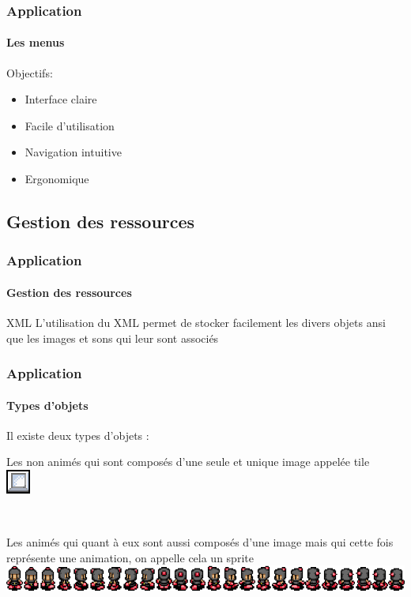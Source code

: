 	\begin{frame}
	\frametitle{Application}
	\framesubtitle{Les menus}
	
		\begin{block}{Objectifs:}
			\begin{itemize}
			  \item Interface claire
			  \item Facile d'utilisation
			  \item Navigation intuitive
			  \item Ergonomique
			\end{itemize}
		\end{block}
	\end{frame}
	
\subsection{Gestion des ressources}

	\begin{frame}
		\frametitle{Application}
		\framesubtitle{Gestion des ressources}
		
		\begin{block}{XML}
			L'utilisation du XML permet de stocker facilement les divers objets ansi que les images et sons qui leur sont associés
		\end{block}
		
	\end{frame}
	
	\begin{frame}
		\frametitle{Application}
		\framesubtitle{Types d'objets}
			Il existe deux types d'objets :
			
			\begin{center}
				Les non animés qui sont composés d'une seule et unique image appelée tile \\
				\includegraphics[scale=0.75]{img/bloc.png}
				
				$\,$
				
				\item Les animés qui quant à eux sont aussi composés d'une image mais qui cette fois représente une animation, on appelle cela un sprite \\
				\includegraphics[scale=0.40]{img/player.png}
			\end{center}		
	\end{frame}
	

